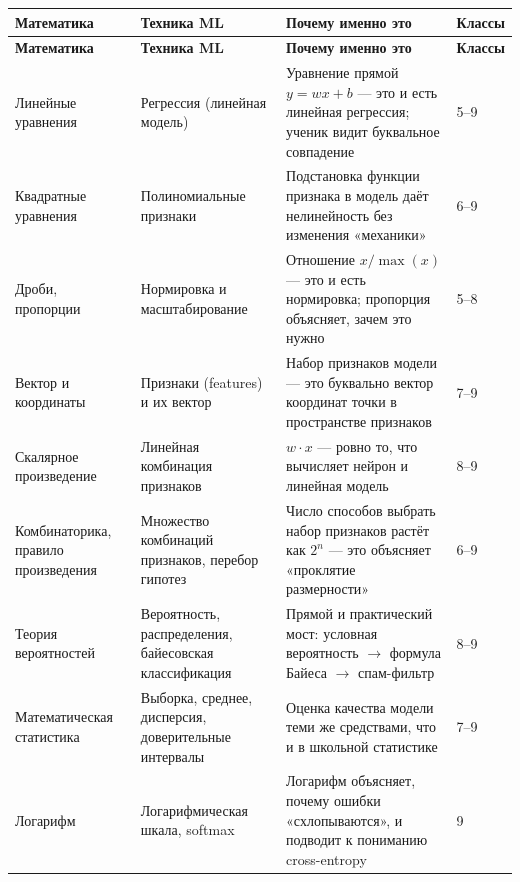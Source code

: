 \documentclass[12pt,a4paper]{article}
\begin{document}
\begin{longtable}{L{3.4cm}L{4.6cm}L{4.6cm}L{2.6cm}}
\toprule
\textbf{Математика} & \textbf{Техника ML} & \textbf{Почему именно это} & \textbf{Классы}\\
\midrule
\endfirsthead

\toprule
\textbf{Математика} & \textbf{Техника ML} & \textbf{Почему именно это} & \textbf{Классы}\\
\midrule
\endhead

Линейные уравнения &
Регрессия (линейная модель) & Уравнение прямой $y = wx + b$ --- это
и есть линейная регрессия; ученик видит буквальное совпадение &
5--9\\

\addlinespace
Квадратные уравнения &
Полиномиальные признаки & Подстановка функции признака в модель
даёт нелинейность без изменения «механики» &
6--9\\

\addlinespace
Дроби, пропорции &
Нормировка и масштабирование & Отношение $x / \max(x)$ --- это
и есть нормировка; пропорция объясняет, зачем это нужно &
5--8\\

\addlinespace
Вектор и координаты &
Признаки (features) и их вектор & Набор признаков модели ---
это буквально вектор координат точки в пространстве признаков &
7--9\\

\addlinespace
Скалярное произведение &
Линейная комбинация признаков & $w \cdot x$ --- ровно то, что
вычисляет нейрон и линейная модель &
8--9\\

\addlinespace
Комбинаторика, правило
произведения &
Множество комбинаций признаков,
перебор гипотез & Число способов выбрать набор признаков растёт
как $2^n$ --- это объясняет «проклятие размерности» &
6--9\\

\addlinespace
Теория вероятностей &
Вероятность, распределения,
байесовская классификация & Прямой и практический мост: условная
вероятность $\rightarrow$ формула Байеса $\rightarrow$ спам-фильтр &
8--9\\

\addlinespace
Математическая
статистика &
Выборка, среднее, дисперсия,
доверительные интервалы & Оценка качества модели теми же
средствами, что и в школьной статистике &
7--9\\

\addlinespace
Логарифм &
Логарифмическая шкала, softmax &
Логарифм объясняет, почему ошибки «схлопываются», и подводит
к пониманию cross-entropy &
9\\


\end{longtable}
\end{document}
